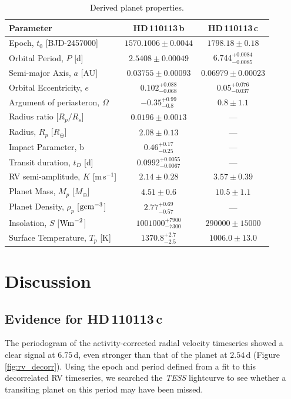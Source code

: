 \documentclass[fleqn,usenatbib]{mnras}
\newcommand{\tess}{{\it TESS}}
\newcommand{\ms}{m\,s$^{-1}$}
\newcommand{\Tplanet}{HD\,110113\,b}
\newcommand{\Tplanetc}{HD\,110113\,c}
\begin{document}
\begin{table}
	\centering
	\caption{Derived planet properties.}
	\label{tab:derived_pars}
\begin{tabular}{lcc}
\hline
\hline
Parameter & \Tplanet{} & \Tplanetc{}\\
\hline
\hline
Epoch, $t_0$ [BJD-2457000] &  $ 1570.1006 \pm 0.0044 $  &  $ 1798.18 \pm 0.18 $  \\
Orbital Period, $P$ [d] &  $ 2.5408 \pm 0.00049 $  &  $ 6.744^{+0.0084}_{-0.0085} $  \\
Semi-major Axis, $a$ [AU] &  $ 0.03755 \pm 0.00093 $  &  $ 0.06979 \pm 0.00023 $  \\
Orbital Eccentricity, $e$ &  $ 0.102^{+0.088}_{-0.068} $  &  $ 0.05^{+0.076}_{-0.037} $  \\
Argument of periasteron, $\Omega$ &  $ -0.35^{+0.99}_{-0.8} $  &  $ 0.8 \pm 1.1 $  \\
Radius ratio [$R_p/R_s$] &  $ 0.0196 \pm 0.0013 $  & --- \\
Radius, $R_p$ [$R_\oplus$] &  $ 2.08 \pm 0.13 $  & --- \\
Impact Parameter, b &  $ 0.46^{+0.17}_{-0.25} $  & --- \\
Transit duration, $t_D$ [d] &  $ 0.0992^{+0.0055}_{-0.0067} $  & --- \\
RV semi-amplitude, $K$ [\ms{}] &  $ 2.14 \pm 0.28 $  &  $ 3.57 \pm 0.39 $  \\
Planet Mass, $M_p$ [$M_\oplus$] &  $ 4.51 \pm 0.6 $  &  $ 10.5 \pm 1.1 $  \\
Planet Density, $\rho_p$ [${\rm gcm}^{-3}$] &  $ 2.77^{+0.69}_{-0.57} $  & --- \\
Insolation, $S$ [${\rm Wm}^{-2}$] &  $ 1001000^{+7900}_{-7300} $  &  $ 290000 \pm 15000 $  \\
Surface Temperature, $T_p$ [K] &  $ 1370.8^{+2.7}_{-2.5} $  &  $ 1006.0 \pm 13.0 $  \\
\hline
\hline
\end{tabular}
\end{table}

\section{Discussion}\label{sect:discus}

\subsection{Evidence for \Tplanetc{}}\label{sect:planetc}
The periodogram of the activity-corrected radial velocity timeseries showed a clear signal at $6.75$\,d, even stronger than that of the planet at $2.54$\,d (Figure \ref{fig:rv_decorr}).
Using the epoch and period defined from a fit to this decorrelated RV timeseries, we searched the \tess{} lightcurve to see whether a transiting planet on this period may have been missed.
\end{document}
